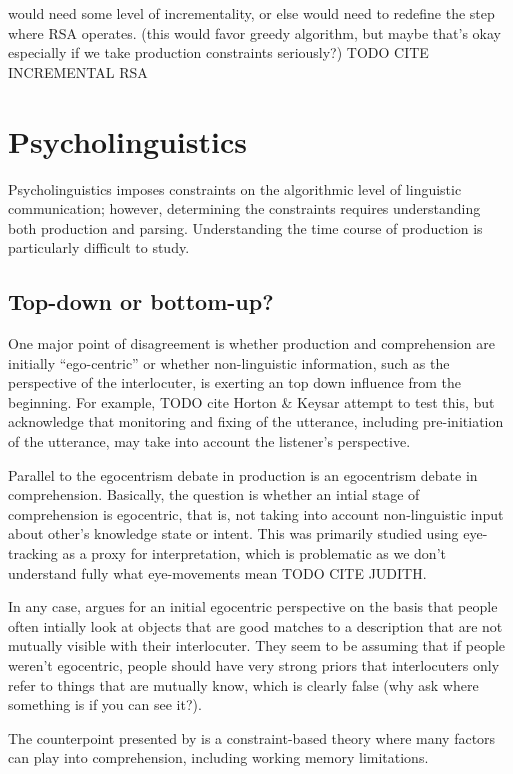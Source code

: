 \documentclass[]{article}
\begin{document}
would need some level of incrementality, or else would need to redefine the step where RSA operates. (this would favor greedy algorithm, but maybe that's okay especially if we take production constraints seriously?)
TODO CITE INCREMENTAL RSA

\section{Psycholinguistics}

Psycholinguistics imposes constraints on the algorithmic level of linguistic communication; however, determining the constraints requires understanding both production and parsing. Understanding the time course of production is particularly difficult to study. 

\subsection{Top-down or bottom-up?}
One major point of disagreement is whether production and comprehension are initially ``ego-centric'' or whether non-linguistic information, such as the perspective of the interlocuter, is exerting an top down influence from the beginning. For example, TODO cite Horton \& Keysar attempt to test this, but acknowledge that monitoring and fixing of the utterance, including pre-initiation of the utterance, may take into account the listener's perspective. %

Parallel to the egocentrism debate in production is an egocentrism debate in comprehension. Basically, the question is whether an intial stage of comprehension is egocentric, that is, not taking into account non-linguistic input about other's knowledge state or intent. This was primarily studied using eye-tracking as a proxy for interpretation, which is problematic as we don't understand fully what eye-movements mean TODO CITE JUDITH. 

In any case, \cite{keysar2000} argues for an initial egocentric perspective on the basis that people often intially look at objects that are good matches to a description that are not mutually visible with their interlocuter. They seem to be assuming that if people weren't egocentric, people should have very strong priors that interlocuters only refer to things that are mutually know, which is clearly false (why ask where something is if you can see it?). 

The counterpoint presented by \cite{hanna2003} is a constraint-based theory where many factors can play into comprehension, including working memory limitations. 
\end{document}
